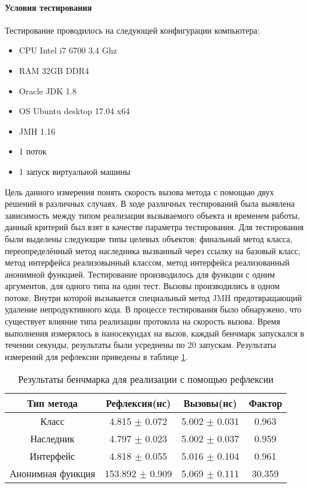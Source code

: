 \paragraph{Условия тестирования}
Тестирование проводилось на следующей конфигурации компьютера:
\begin{itemize}
    \item CPU Intel i7 6700 3.4 Ghz
    \item RAM 32GB DDR4
    \item Oracle JDK 1.8
    \item OS Ubuntu desktop 17.04 x64
    \item JMH 1.16
    \item 1 поток
    \item 1 запуск виртуальной машины
\end{itemize}

Цель данного измерения понять скорость вызова метода с помощью двух решений в различных случаях. В ходе различных тестирований была выявлена зависимость между типом реализации вызываемого объекта и временем работы, данный критерий был взят в качестве параметра тестирования. Для тестирования были выделены следующие типы целевых объектов: финальный метод класса, переопределённый метод наследника вызванный через ссылку на базовый класс, метод интерфейса реализовынный классом, метод интерфейса реализованный анонимной функцией. Тестирование производилось для функции с одним аргументов, для одного типа на один тест. Вызовы производились в одном потоке. Внутри которой вызывается специальный метод JMH предотвращающий удаление непродуктивного кода. В процессе тестирования было обнаружено, что существует влияние типа реализации протокола на скорость вызова. Время выполнения измерялось в наносекундах на вызов, каждый бенчмарк запускался в течении секунды, результаты были усреднены по 20 запускам. Результаты измерений для рефлексии приведены в таблице \ref{benchmark:prototype}.
\begin{table}[h]
\begin{center}
\begin{tabular}{|c|c|c|c|} \hline
Тип метода & Рефлексия(нс) &  Вызовы(нс) & Фактор \\ \hline
Класс & 4.815 $\pm$ 0.072 & 5.002 $\pm$ 0.031 & 0.963 \\ \hline
Наследник & 4.797 $\pm$ 0.023 & 5.002 $\pm$ 0.037 & 0.959 \\ \hline
Интерфейс & 4.818 $\pm$ 0.055 & 5.016 $\pm$ 0.104 & 0.961 \\ \hline
Анонимная функция & 153.892 $\pm$ 0.909 & 5.069 $\pm$ 0.111 & 30.359 \\ \hline
\end{tabular}
\caption{Результаты бенчмарка для реализации с помощью рефлексии}
\label{benchmark:prototype}
\end{center}
\end{table}

